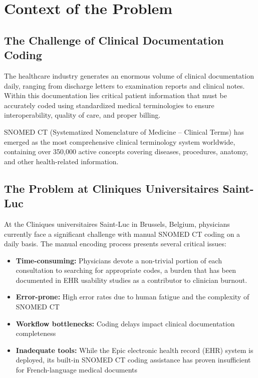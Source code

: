 

\section{Context of the Problem}

\subsection{The Challenge of Clinical Documentation Coding}

The healthcare industry generates an enormous volume of clinical documentation daily, ranging from discharge letters to examination reports and clinical notes. Within this documentation lies critical patient information that must be accurately coded using standardized medical terminologies to ensure interoperability, quality of care, and proper billing.

SNOMED CT (Systematized Nomenclature of Medicine -- Clinical Terms) has emerged as the most comprehensive clinical terminology system worldwide, containing over 350,000 active concepts covering diseases, procedures, anatomy, and other health-related information.

\subsection{The Problem at Cliniques Universitaires Saint-Luc}

At the Cliniques universitaires Saint-Luc in Brussels, Belgium, physicians currently face a significant challenge with manual SNOMED CT coding on a daily basis. The manual encoding process presents several critical issues:

\begin{itemize}
    \item \textbf{Time-consuming:} Physicians devote a non-trivial portion of each consultation to searching for appropriate codes, a burden that has been documented in EHR usability studies as a contributor to clinician burnout. %
    \item \textbf{Error-prone:} High error rates due to human fatigue and the complexity of SNOMED CT
    \item \textbf{Workflow bottlenecks:} Coding delays impact clinical documentation completeness
    \item \textbf{Inadequate tools:} While the Epic electronic health record (EHR) system is deployed, its built-in SNOMED CT coding assistance has proven insufficient for French-language medical documents
\end{itemize}

